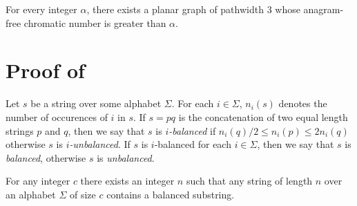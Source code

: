 \documentclass{patmorin}
\begin{document}
\begin{thm}
  For every integer $\alpha$, there exists a planar graph of pathwidth
  3 whose anagram-free chromatic number is greater than $\alpha$.
\end{thm}



\section{Proof of }

Let $s$ be a string over some alphabet $\Sigma$.  For each $i\in\Sigma$,
$n_i(s)$ denotes the number of occurences of $i$ in $s$.  If $s=pq$ is the
concatenation of two equal length strings $p$ and $q$, then we say that
$s$ is \emph{$i$-balanced} if $n_i(q)/2\le n_i(p)\le 2n_i(q)$ otherwise
$s$ is \emph{$i$-unbalanced}.  If $s$ is $i$-balanced for each $i\in \Sigma$,
then we say that $s$ is \emph{balanced}, otherwise $s$ is \emph{unbalanced}.

\begin{lem}
  For any integer $c$ there exists an integer $n$ such that any string
  of length $n$ over an alphabet $\Sigma$ of size $c$ contains a balanced
  substring.
\end{lem}
\end{document}
